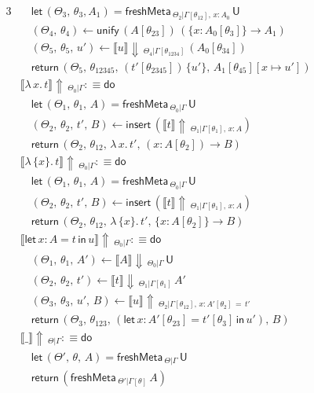 \documentclass[acmsmall,review,anonymous,prologue,dvipsnames]{acmart}\settopmatter{printfolios=true,printccs=false,printacmref=false}
\newcommand{\slet}{\boldsymbol{\mathsf{let}}}
\renewcommand{\sin}{\boldsymbol{\mathsf{in}}}
\renewcommand{\U}{\mathsf{U}}
\newcommand{\freshMeta}[3]{\mathsf{freshMeta}\,_{#1|#2}\,#3}
\newcommand{\unify}{\mathsf{unify}}
\newcommand{\echeck}[4]{\llbracket#1\rrbracket\!\Downarrow\,_{#2|#3}\,#4}
\newcommand{\einfer}[3]{\llbracket#1\rrbracket\!\Uparrow\,_{#2|#3}}
\newcommand{\edo}{\boldsymbol{\mathsf{do}}}
\newcommand{\ereturn}{\boldsymbol{\mathsf{return}}}
\newcommand{\einsert}{\mathsf{insert}}
\theoremstyle{remark}
\begin{document}
\begin{alignat*}{3}
  &\quad \slet\,(\Theta_3,\,\theta_3,A_1) = \freshMeta{\Theta_2}{\Gamma[\theta_{12}],\,x:A_0}{\U}\\
  &\quad (\Theta_4,\,\theta_4) \leftarrow \unify\,(A[\theta_{23}])\,(\{x : A_0[\theta_3]\}\to A_1)\\
  &\quad (\Theta_5,\,\theta_5,\,u') \leftarrow \echeck{u}{\Theta_4}{\Gamma[\theta_{1234}]}{(A_0[\theta_{34}])}\\
                 &\quad \ereturn\,(\Theta_5,\,\theta_{12345},\,(t'[\theta_{2345}])\,\{u'\},\,A_1[\theta_{45}][x\mapsto u'])\\
  &\einfer{\lambda\,x.\,t}{\Theta_0}{\Gamma} :\equiv \edo \\
  &\quad \slet\, (\Theta_1,\,\theta_1,\,A) = \freshMeta{\Theta_0}{\Gamma}{\U}\\
  &\quad(\Theta_2,\,\theta_2,\,t',\,B)\leftarrow \einsert\,(\einfer{t}{\Theta_1}{\Gamma[\theta_1],\,x:A})\\
  &\quad\ereturn\,(\Theta_2,\,\theta_{12},\,\lambda\,x.\,t',\,(x : A[\theta_2])\to B)\\
  &\einfer{\lambda\,\{x\}.\,t}{\Theta_0}{\Gamma} :\equiv \edo \\
  &\quad \slet\,(\Theta_1,\,\theta_1,\,A) = \freshMeta{\Theta_0}{\Gamma}{\U}\\
  &\quad(\Theta_2,\,\theta_2,\,t',\,B)\leftarrow \einsert\,(\einfer{t}{\Theta_1}{\Gamma[\theta_1],\,x:A}) \\
  &\quad\ereturn\,(\Theta_2,\,\theta_{12},\,\lambda\,\{x\}.\,t',\,\{x : A[\theta_2]\}\to B)\\
  &\einfer{\slet\,x:A=t\,\sin\,u}{\Theta_0}{\Gamma} :\equiv \edo \\
  &\quad(\Theta_1,\,\theta_1,\,A') \leftarrow \echeck{A}{\Theta_0}{\Gamma}{\U}\\
  &\quad(\Theta_2,\,\theta_2,\,t') \leftarrow \echeck{t}
                {\Theta_1}{\Gamma[\theta_1]}{A'}\\
  &\quad(\Theta_3,\,\theta_3,\,u',\,B) \leftarrow
                \einfer{u}{\Theta_2}{\Gamma[\theta_{12}],\,x:A'[\theta_2]\,=\,t'}\\
  &\quad\ereturn\,(\Theta_3,\,\theta_{123},\,(\slet\,x:A'[\theta_{23}]=t'[\theta_3]\,\sin\,u'),\,B)\\
  &\einfer{\_}{\Theta}{\Gamma} :\equiv \edo \\
  &\quad \slet\,(\Theta',\,\theta,\,A) = \freshMeta{\Theta}{\Gamma}{\U}\\
  &\quad \ereturn\,(\freshMeta{\Theta'}{\Gamma[\theta]}{A})\\
\end{alignat*}
\endgroup
\end{document}
